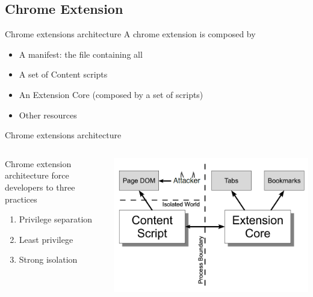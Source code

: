 \documentclass[11pt]{beamer}
\begin{document}
\subsection{Chrome Extension}
\begin{frame}{Chrome extensions architecture}
A chrome extension is composed by
\begin{itemize}
\item A manifest: the file containing all 
\item A set of Content scripts
\item An Extension Core (composed by a set of scripts)
\item Other resources
\end{itemize}
\end{frame}

\begin{frame}{Chrome extensions architecture}
\begin{columns}[T]
\begin{column}{.48\textwidth}
Chrome extension architecture force developers to three practices
\begin{enumerate}
\item Privilege separation
\item Least privilege
\item Strong isolation
\end{enumerate}
\end{column}%
\begin{column}{.48\textwidth}
\includegraphics[scale=0.25]{Images/StrongIsolation.png}
\end{column}%
\end{columns}
\end{frame}
\end{document}
